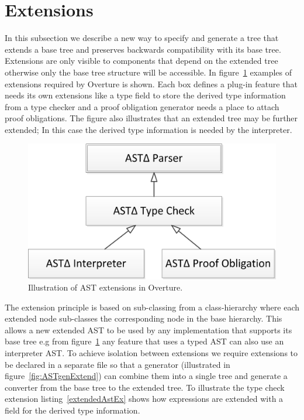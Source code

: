 \documentclass{overturerepchap}
\begin{document}
\section{Extensions}



In this subsection we describe a new way to specify and generate a tree that extends a base tree and preserves backwards compatibility with its base tree. Extensions are only visible to components that depend on the extended tree otherwise only the base tree structure will be accessible. In figure~\ref{fig:ast_extensions} examples of extensions required by Overture is shown. Each box defines a plug-in feature that needs its own extensions like a type field to store the derived type information from a type checker and a proof obligation generator needs a place to attach proof obligations. The figure also illustrates that an extended tree may be further extended; In this case the derived type information is needed by the interpreter. 

\begin{figure}[tbh]
\centering
\includegraphics[width=.4\textwidth]{figures/ast_extensions}
\caption{Illustration of AST extensions in Overture.\label{fig:ast_extensions}}
\end{figure}

The extension principle is based on sub-classing from a class-hierarchy where each extended node sub-classes the corresponding node in the base hierarchy. This allows a new extended AST to be used by any implementation that supports its base tree e.g from figure~\ref{fig:ast_extensions} any feature that uses a typed AST can also use an interpreter AST.
To achieve isolation between extensions we require extensions to be declared in a separate file so that a generator (illustrated in figure~\ref{fig:ASTgenExtend}) can combine them into a single tree and generate a converter from the base tree to the extended tree. To illustrate the type check extension listing~\ref{extendedAstEx} shows how expressions are extended with a field for the derived type information.
\end{document}
